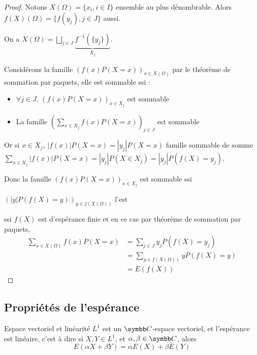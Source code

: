 \begin{proof}
    Notons $X(\Omega) = \{x_i, i \in I\}$ ensemble au plus dénombrable. Alors 
    $f(X)(\Omega) = \{f(y_j), j \in J\}$ aussi.

    On a $X(\Omega) = \bigsqcup_{j \in J} \underbrace{f^{-1}(\{y_j\})}_{X_j}$.

    Considérons la famille $(f(x) P(X = x))_{x \in X(\Omega)}$ par le théorème de sommation 
    par paquets, elle est sommable ssi : 
    \begin{itemize}
        \item $\forall j \in J, \, (f(x) P(X = x))_{x \in X_j}$ est sommable
        \item La famille $\displaystyle \left(\sum_{x \in X_j} f(x) P(X = x)\right)_{j \in J}$ est sommable
    \end{itemize}

    Or si $x \in X_j$, $|f(x)| P(X = x) = |y_j| P(X = x)$ famille sommable 
    de somme $\displaystyle \sum_{x \in X_j} |f(x)| P(X = x) = |y_j| P(X \in X_j) = |y_j| P(f(X) = y_j)$.

    Donc la famille $(f(x) P(X = x))_{x \in X_j}$ est sommable ssi 

    $(|y| P(f(X) = y))_{y \in f(X(\Omega))}$ l'est 

    ssi $f(X)$ est d'espérance finie
    et en ce cas par théorème de sommation par paquets,
    \begin{align}
        \sum_{x \in X(\Omega)} f(x) P(X = x) & = \sum_{j \in J} y_j P(f(X) = y_j) \\
        & = \sum_{y \in f(X(\Omega))} y P(f(X) = y) \\
        & = E(f(X))
    \end{align}
\end{proof}

\subsection{Propriétés de l'espérance}

\begin{proposition}{Espace vectoriel et linéarité}{}
    $L^1$ est un $\C$-espace vectoriel, et l'espérance est linéaire, c'est à dire si 
    $X, Y \in L^1$, et $\alpha, \beta \in \C$, alors
    $$ E(\alpha X + \beta Y) = \alpha E(X) + \beta E(Y) $$
\end{proposition}


